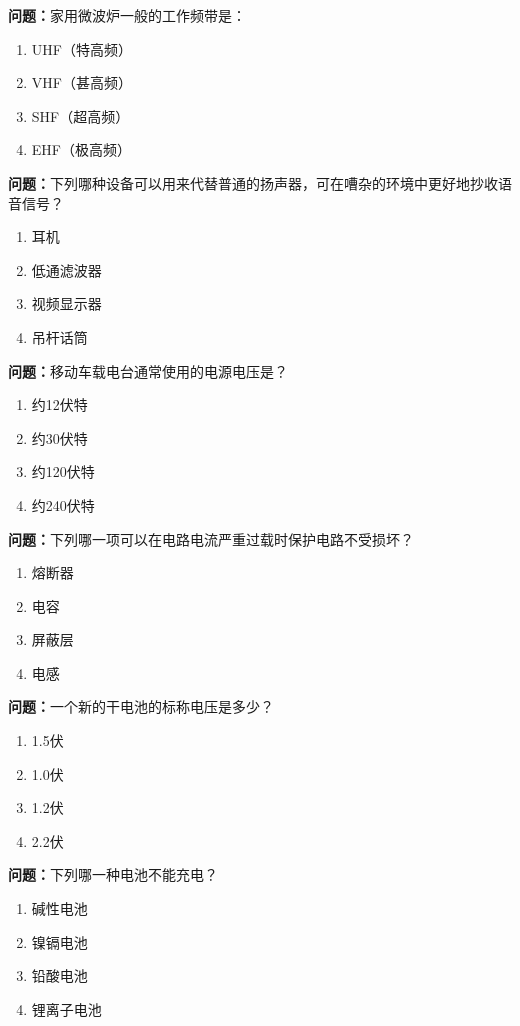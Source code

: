 \documentclass{ctexbook}
\begin{document}
\textbf{问题：}家用微波炉一般的工作频带是：
\begin{enumerate}[label=\Alph*), leftmargin=3em]
\item UHF（特高频）
\item VHF（甚高频）
\item SHF（超高频）
\item EHF（极高频）
\end{enumerate}

\textbf{问题：}下列哪种设备可以用来代替普通的扬声器，可在嘈杂的环境中更好地抄收语音信号？
\begin{enumerate}[label=\Alph*), leftmargin=3em]
\item 耳机
\item 低通滤波器
\item 视频显示器
\item 吊杆话筒
\end{enumerate}

\textbf{问题：}移动车载电台通常使用的电源电压是？
\begin{enumerate}[label=\Alph*), leftmargin=3em]
\item 约12伏特
\item 约30伏特
\item 约120伏特
\item 约240伏特
\end{enumerate}

\textbf{问题：}下列哪一项可以在电路电流严重过载时保护电路不受损坏？
\begin{enumerate}[label=\Alph*), leftmargin=3em]
\item 熔断器
\item 电容
\item 屏蔽层
\item 电感
\end{enumerate}

\textbf{问题：}一个新的干电池的标称电压是多少？
\begin{enumerate}[label=\Alph*), leftmargin=3em]
\item 1.5伏
\item 1.0伏
\item 1.2伏
\item 2.2伏
\end{enumerate}

\textbf{问题：}下列哪一种电池不能充电？
\begin{enumerate}[label=\Alph*), leftmargin=3em]
\item 碱性电池
\item 镍镉电池
\item 铅酸电池
\item 锂离子电池
\end{enumerate}
\end{document}
